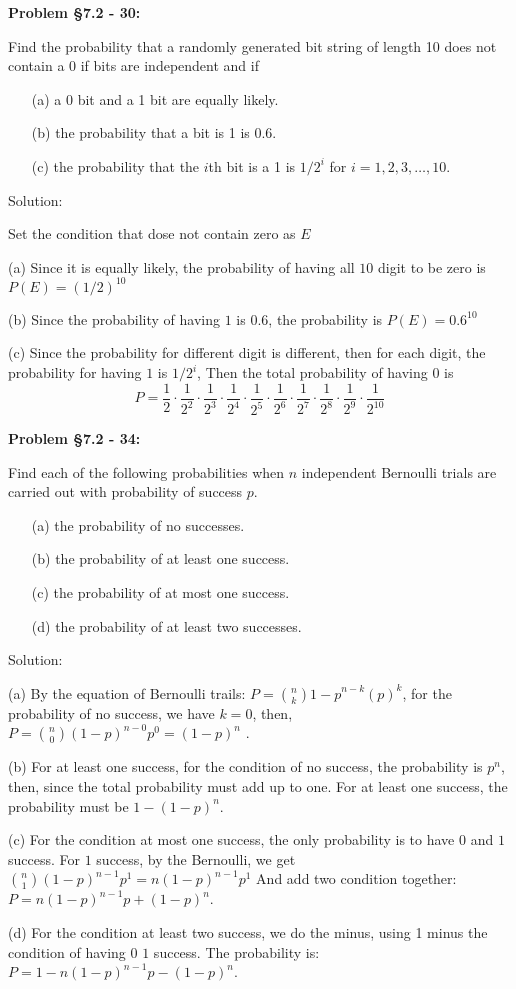 \documentclass{article}
\newenvironment{problem}[1]
{\begin{mdframed}[default]
\textbf{Problem #1:}
}
{\end{mdframed}
}
\begin{document}
\begin{problem}{\S 7.2 - 30}
Find the probability that a randomly generated bit string of length 10 does not
contain a 0 if bits are independent and if
\begin{enumerate}
\item[(a)] a 0 bit and a 1 bit are equally likely.
\item[(b)] the probability that a bit is 1 is 0.6.
\item[(c)] the probability that the $i$th bit is a 1 is $1/2^i$ for $i = 1, 2,
3, \dots, 10$.
\end{enumerate}

Solution:

Set the condition that dose not contain zero as $E$

(a) Since it is equally likely, the probability of having all $10$ digit to be zero is $P(E)=(1/2)^{10}$

(b) Since the probability of having $1$ is $0.6$, the probability is $P(E)=0.6^{10}$

(c) Since the probability for different digit is different, then for each digit, the probability for having $1$ is $1/{2^i}$, 
Then the total probability of having $0$ is 
\[P=\frac{1}{2}\cdot\frac{1}{2^2}\cdot\frac{1}{2^3}\cdot\frac{1}{2^4}\cdot\frac{1}{2^5}\cdot\frac{1}{2^6}\cdot\frac{1}{2^7}\cdot\frac{1}{2^8}\cdot\frac{1}{2^9}\cdot\frac{1}{2^{10}}\]

\end{problem}
\begin{problem}{\S 7.2 - 34}
Find each of the following probabilities when $n$ independent Bernoulli trials are
carried out with probability of success $p$.
\begin{enumerate}
\item[(a)] the probability of no successes.
\item[(b)] the probability of at least one success.
\item[(c)] the probability of at most one success.
\item[(d)] the probability of at least two successes.
\end{enumerate}

Solution:

(a) By the equation of Bernoulli trails: $P={n\choose k}{1-p}^{n-k}(p)^k$, for the probability of no success, we have $k=0$, then, $P={n\choose 0}(1-p)^{n-0}p^0=(1-p)^n$
.

(b) For at least one success, for the condition of no success, the probability is $p^n$, then, since the total probability must add up to one. 
For at least one success, the probability must be $1-(1-p)^n$.

(c) For the condition at most one success, the only probability is to have $0$ and $1$ success. For $1$ success, by the Bernoulli, we get ${n\choose 1}(1-p)^{n-1}p^1=n(1-p)^{n-1}p^1$
And add two condition together: $P=n(1-p)^{n-1}p+(1-p)^n$.


(d) For the condition at least two success, we do the minus, using 1 minus the condition of having $0$ $1$ success.
The probability is: $P=1-n(1-p)^{n-1}p-(1-p)^n$.

\end{problem}
\end{document}
